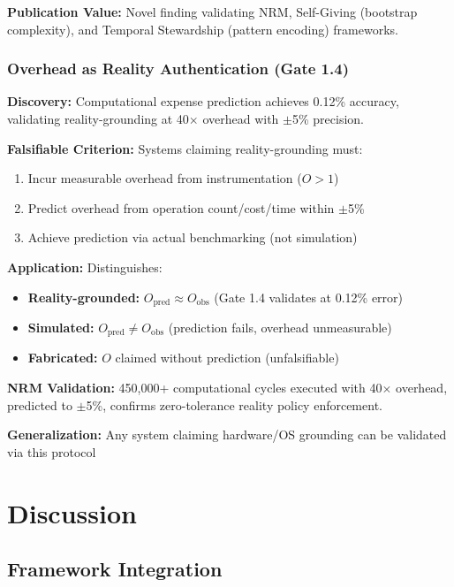 \documentclass[11pt]{article}
\begin{document}
\textbf{Publication Value:} Novel finding validating NRM, Self-Giving (bootstrap complexity), and Temporal Stewardship (pattern encoding) frameworks.

\subsubsection{Overhead as Reality Authentication (Gate 1.4)}

\textbf{Discovery:} Computational expense prediction achieves 0.12\% accuracy, validating reality-grounding at 40$\times$ overhead with $\pm$5\% precision.

\textbf{Falsifiable Criterion:} Systems claiming reality-grounding must:
\begin{enumerate}
\item Incur measurable overhead from instrumentation ($O > 1$)
\item Predict overhead from operation count/cost/time within $\pm$5\%
\item Achieve prediction via actual benchmarking (not simulation)
\end{enumerate}

\textbf{Application:} Distinguishes:
\begin{itemize}
\item \textbf{Reality-grounded:} $O_{\text{pred}} \approx O_{\text{obs}}$ (Gate 1.4 validates at 0.12\% error)
\item \textbf{Simulated:} $O_{\text{pred}} \neq O_{\text{obs}}$ (prediction fails, overhead unmeasurable)
\item \textbf{Fabricated:} $O$ claimed without prediction (unfalsifiable)
\end{itemize}

\textbf{NRM Validation:} 450,000+ computational cycles executed with 40$\times$ overhead, predicted to $\pm$5\%, confirms zero-tolerance reality policy enforcement.

\textbf{Generalization:} Any system claiming hardware/OS grounding can be validated via this protocol


\section{Discussion}

\subsection{Framework Integration}
\end{document}
